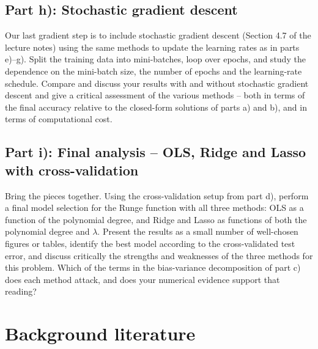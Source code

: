 \documentclass[11pt,a4paper]{article}
\begin{document}
\subsection*{Part h): Stochastic gradient descent}

Our last gradient step is to include stochastic gradient descent (Section 4.7
of the lecture notes) using the same methods to update the learning rates as
in parts e)--g).  Split the training data into mini-batches, loop over
epochs, and study the dependence on the mini-batch size, the number of
epochs and the learning-rate schedule.  Compare and discuss your results with
and without stochastic gradient descent and give a critical assessment of the
various methods -- both in terms of the final accuracy relative to the
closed-form solutions of parts a) and b), and in terms of computational cost.

\subsection*{Part i): Final analysis -- OLS, Ridge and Lasso with cross-validation}

Bring the pieces together.  Using the cross-validation setup from part d), perform a final model
selection for the Runge function with all three methods: OLS as a function
of the polynomial degree, and Ridge and Lasso as functions of both the
polynomial degree and $\lambda$.  Present the results as a small number of
well-chosen figures or tables, identify the best model according to the
cross-validated test error, and discuss critically the strengths and
weaknesses of the three methods for this problem.  Which of the terms in the
bias-variance decomposition of part c) does each method attack, and does your
numerical evidence support that reading?

\section*{Background literature}
\end{document}
